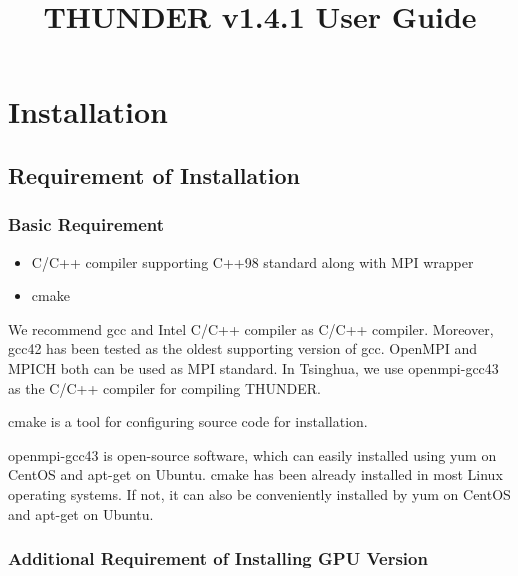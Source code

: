 \documentclass{article}
\begin{document}
    \title{THUNDER v1.4.1 User Guide}
    \maketitle
    
    \section{Installation}
    
        \subsection{Requirement of Installation}
        
            \subsubsection{Basic Requirement}
        
                \begin{itemize}
                    \item C/C++ compiler supporting C++98 standard along with MPI wrapper
                    \item \textsf{cmake}
                \end{itemize}
                
                We recommend \textsf{gcc} and Intel C/C++ compiler as C/C++ compiler. Moreover, \textsf{gcc42} has been tested as the oldest supporting version of \textsf{gcc}. OpenMPI and MPICH both can be used as MPI standard. In Tsinghua, we use \textsf{openmpi-gcc43} as the C/C++ compiler for compiling THUNDER.
                
                \textsf{cmake} is a tool for configuring source code for installation.
                
                \textsf{openmpi-gcc43} is open-source software, which can easily installed using \textsf{yum} on CentOS and \textsf{apt-get} on Ubuntu. \textsf{cmake} has been already installed in most Linux operating systems. If not, it can also be conveniently installed by \textsf{yum} on CentOS and \textsf{apt-get} on Ubuntu.
            
            \subsubsection{Additional Requirement of Installing GPU Version}
            
\end{document}
